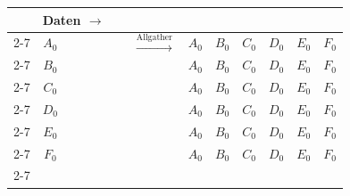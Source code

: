 \begin{figure}[b]
      \begin{subfigure}[l]{0.87\textwidth}
	\begin{tabular}[]{m{0.2cm} m{0.3cm}|m{0.3cm}|m{0.3cm}|m{0.3cm}|m{0.3cm}|m{0.3cm} m{1.5cm} m{0.3cm}|m{0.3cm}|m{0.3cm}|m{0.3cm}|m{0.3cm}|m{0.3cm}}
	  & \multicolumn{13}{l}{Daten $\longrightarrow$}\\
	  \cline{2-7} \cline{9-14}
	  \multirow{6}{*}{\begin{turn}{-90} Prozesse $\longrightarrow$ \end{turn}}
	  &\multicolumn{1}{|c|}{$A_0$}& & & & &\multicolumn{1}{|m{0.3cm}|}{ } &\multirow{6}{*}{\large $\xrightarrow{\text{Allgather}}$} & \multicolumn{1}{|c|}{$A_0$}&$B_0$&$C_0$&$D_0$&$E_0$&\multicolumn{1}{|m{0.3cm}|}{$F_0$}\\
	  \cline{2-7} \cline{9-14}
	  &\multicolumn{1}{|c|}{$B_0$}& & & & &\multicolumn{1}{|c|}{ }                         & & \multicolumn{1}{|c|}{$A_0$}&$B_0$&$C_0$&$D_0$&$E_0$&\multicolumn{1}{|m{0.3cm}|}{$F_0$}\\
	  \cline{2-7} \cline{9-14}
	  &\multicolumn{1}{|c|}{$C_0$}& & & & &\multicolumn{1}{|c|}{ }                         & & \multicolumn{1}{|c|}{$A_0$}&$B_0$&$C_0$&$D_0$&$E_0$&\multicolumn{1}{|m{0.3cm}|}{$F_0$}\\
	  \cline{2-7} \cline{9-14}
	  &\multicolumn{1}{|c|}{$D_0$}& & & & &\multicolumn{1}{|c|}{ }                         & & \multicolumn{1}{|c|}{$A_0$}&$B_0$&$C_0$&$D_0$&$E_0$&\multicolumn{1}{|m{0.3cm}|}{$F_0$}\\
	  \cline{2-7} \cline{9-14}
	  &\multicolumn{1}{|c|}{$E_0$}& & & & &\multicolumn{1}{|c|}{ }                         & & \multicolumn{1}{|c|}{$A_0$}&$B_0$&$C_0$&$D_0$&$E_0$&\multicolumn{1}{|m{0.3cm}|}{$F_0$}\\
	  \cline{2-7} \cline{9-14}
	  &\multicolumn{1}{|c|}{$F_0$}& & & & &\multicolumn{1}{|c|}{ }                         & & \multicolumn{1}{|c|}{$A_0$}&$B_0$&$C_0$&$D_0$&$E_0$&\multicolumn{1}{|m{0.3cm}|}{$F_0$}\\
	  \cline{2-7} \cline{9-14}
	\end{tabular}
      \end{subfigure}
      

\end{figure}
